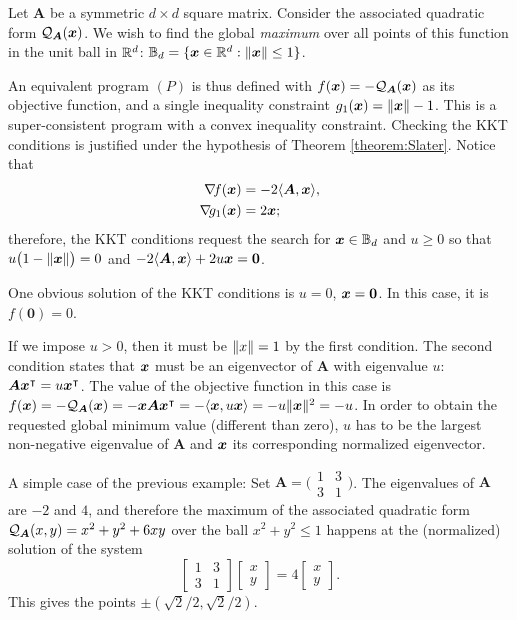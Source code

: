 \begin{example}
Let $\boldsymbol{A}$ be a symmetric $d \times d$ square matrix.  Consider the associated quadratic form $\mathcal{Q}_{\boldsymbol{A}}(\boldsymbol{x})$.  We wish to find the global \emph{maximum} over all points of this function in the unit ball in $\mathbb{R}^d$: $\mathbb{B}_d = \{ \boldsymbol{x} \in \mathbb{R}^d : \lVert \boldsymbol{x} \rVert \leq 1 \}$.

An equivalent program $(P)$ is thus defined with $f(\boldsymbol{x}) = -\mathcal{Q}_{\boldsymbol{A}}(\boldsymbol{x})$ as its objective function, and a single inequality constraint $g_1(\boldsymbol{x}) = \lVert \boldsymbol{x} \rVert-1$.  This is a super-consistent program with a convex inequality constraint.  Checking the KKT conditions is justified under the hypothesis of Theorem \ref{theorem:Slater}.  Notice that 
\begin{align*}
\mathop{\nabla\! {f}}(\boldsymbol{x}) &= -2 \langle \boldsymbol{A}, \boldsymbol{x} \rangle, \\
\mathop{\nabla\! {g_1}}(\boldsymbol{x}) &= 2\boldsymbol{x};
\end{align*}
therefore, the KKT conditions request the search for $\boldsymbol{x} \in \mathbb{B}_d$ and $u \geq 0$ so that $u\big(1-\lVert \boldsymbol{x} \rVert\big)=0$ and $-2\langle \boldsymbol{A}, \boldsymbol{x} \rangle + 2u\boldsymbol{x} = \boldsymbol{0}$.  

One obvious solution of the KKT conditions is $u=0$, $\boldsymbol{x}=\boldsymbol{0}$.  In this case, it is $f(\boldsymbol{0})=0$.

If we impose $u>0$, then it must be $\lVert x \rVert=1$ by the first condition.  The second condition states that $\boldsymbol{x}$ must be an eigenvector of $\boldsymbol{A}$ with eigenvalue $u$: $\boldsymbol{A} {\boldsymbol{x}}^\intercal = u {\boldsymbol{x}}^\intercal$.  The value of the objective function in this case is $f(\boldsymbol{x}) = -\mathcal{Q}_{\boldsymbol{A}}(\boldsymbol{x}) = -\boldsymbol{x} \boldsymbol{A} {\boldsymbol{x}}^\intercal = -\langle \boldsymbol{x}, u\boldsymbol{x} \rangle = -u \lVert \boldsymbol{x} \rVert^2= -u$.  In order to obtain the requested global minimum value (different than zero), $u$ has to be the largest non-negative eigenvalue of $\boldsymbol{A}$ and $\boldsymbol{x}$ its corresponding normalized eigenvector.
\end{example}

\begin{example}
A simple case of the previous example: Set $\boldsymbol{A} = \big( \begin{smallmatrix} 1 & 3 \\ 3 & 1 \end{smallmatrix}\big)$.  The eigenvalues of $\boldsymbol{A}$ are $-2$ and $4$, and therefore the maximum of the associated quadratic form $\mathcal{Q}_{\boldsymbol{A}}(x,y) = x^2+y^2+6xy$ over the ball $x^2+y^2\leq 1$ happens at the (normalized) solution of the system
\begin{equation*}
\begin{bmatrix} 1 & 3 \\ 3 & 1 \end{bmatrix} \begin{bmatrix} x \\ y \end{bmatrix} = 4\begin{bmatrix} x \\ y \end{bmatrix}.
\end{equation*}
This gives the points $\pm(\sqrt{2}/2, \sqrt{2}/2)$.
\end{example}

